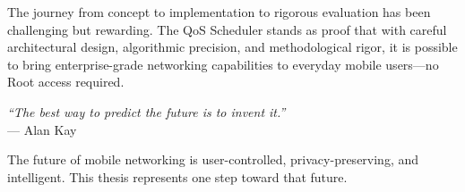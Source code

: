 The journey from concept to implementation to rigorous evaluation has been challenging but rewarding. The QoS Scheduler stands as proof that with careful architectural design, algorithmic precision, and methodological rigor, it is possible to bring enterprise-grade networking capabilities to everyday mobile users---no Root access required.

\vspace{1cm}

\noindent\textit{``The best way to predict the future is to invent it.''} \\
\hspace*{2cm}--- Alan Kay

\vspace{0.5cm}

\noindent The future of mobile networking is user-controlled, privacy-preserving, and intelligent. This thesis represents one step toward that future.

